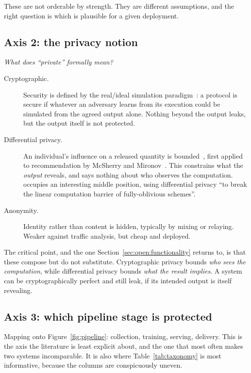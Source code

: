 These are not orderable by strength. They are different assumptions, and the right question is
which is plausible for a given deployment.

\subsection{Axis 2: the privacy notion}
\label{sec:taxonomy:notion}

\emph{What does ``private'' formally mean?}

\begin{description}
  \item[Cryptographic.] Security is defined by the real/ideal simulation
        paradigm~\cite{lindell2017,evans2018}: a protocol is secure if whatever an adversary
        learns from its execution could be simulated from the agreed output alone. Nothing beyond
        the output leaks, but the output itself is not protected.
  \item[Differential privacy.] An individual's influence on a released quantity is
        bounded~\cite{dwork2014}, first applied to recommendation by McSherry and
        Mironov~\cite{mcsherry2009}. This constrains what the \emph{output} reveals, and says
        nothing about who observes the computation. \wally{} occupies an interesting middle
        position, using differential privacy ``to break the linear computation barrier of
        fully-oblivious schemes''.
  \item[Anonymity.] Identity rather than content is hidden, typically by mixing or relaying.
        Weaker against traffic analysis, but cheap and deployed.
\end{description}

The critical point, and the one Section~\ref{sec:open:functionality} returns to, is that these
compose but do not substitute. Cryptographic privacy bounds \emph{who sees the computation}, while
differential privacy bounds \emph{what the result implies}. A system can be cryptographically
perfect and still leak, if its intended output is itself revealing.

\subsection{Axis 3: which pipeline stage is protected}
\label{sec:taxonomy:stage}

Mapping onto Figure~\ref{fig:pipeline}: collection, training, serving, delivery. This is the axis
the literature is least explicit about, and the one that most often makes two systems
incomparable. It is also where Table~\ref{tab:taxonomy} is most informative, because the columns
are conspicuously uneven.

